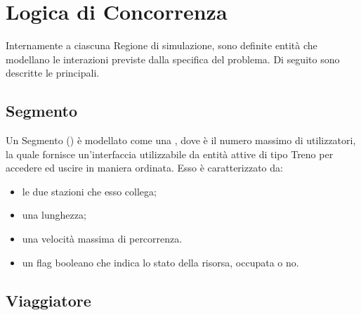 \section{Logica di Concorrenza}

Internamente a ciascuna Regione di simulazione, sono definite entità che modellano le interazioni previste dalla specifica del problema. Di seguito sono descritte le principali.

	
	\subsection{Segmento}
	
	Un Segmento () è modellato come una , dove  è il numero massimo di utilizzatori, la quale fornisce un'interfaccia utilizzabile da entità attive di tipo Treno per accedere ed uscire in maniera ordinata. Esso è caratterizzato da:
			\begin{itemize}
				\item le due stazioni che esso collega;
				\item una lunghezza;
				\item una velocità massima di percorrenza.
				\item un flag booleano  che indica lo stato della risorsa, occupata o no.
			\end{itemize}


	\subsection{Viaggiatore}\label{subsec:traveler_def}		
	
